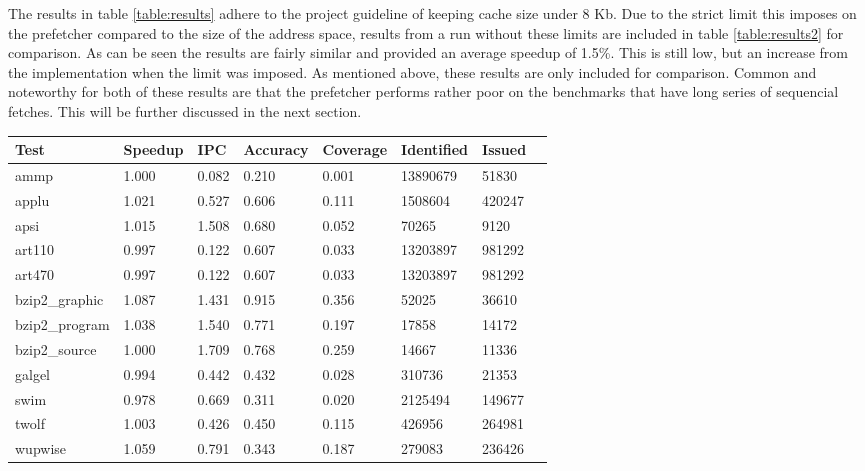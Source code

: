 The results in table \ref{table:results} adhere to the project guideline of keeping cache size under 8 Kb. Due to the strict limit this imposes on the prefetcher compared to the size of the address space, results from a run without these limits are included in table \ref{table:results2} for comparison.
As can be seen the results are fairly similar and provided an average speedup of 1.5\%. This is still low, but an increase from the implementation when the limit was imposed. As mentioned above, these results are only included for comparison.
Common and noteworthy for both of these results are that the prefetcher performs rather poor on the benchmarks that have long series of sequencial fetches. This will be further discussed in the next section.



\begin{table*}[!t]
\renewcommand{\arraystretch}{1.3}
\caption{Prefetcher results without cache size limit}
\label{table:results2}
\centering
\begin{tabular}{|l|l|l|l|l|l|l|l|}
\hline
\bfseries Test & \bfseries Speedup & \bfseries IPC & \bfseries Accuracy & \bfseries Coverage & \bfseries Identified & \bfseries Issued\\
\hline
\hline
ammp 		& 1.000  &	0.082 &	0.210 &	0.001 &	13890679 &	51830\\
applu 		& 1.021 & 	0.527 &	0.606 &	0.111 &	1508604 & 	420247\\
apsi 		& 1.015 & 	1.508 &	0.680 &	0.052 &	70265 &	9120\\	
art110 		& 0.997 & 	0.122 &	0.607 &	0.033 &	13203897 &	981292\\	
art470 		& 0.997 & 	0.122 &	0.607 &	0.033 &	13203897 &	981292\\
bzip2\_graphic 	& 1.087 & 	1.431 &	0.915 &	0.356 &	52025 &	36610\\
bzip2\_program 	& 1.038 & 	1.540 &	0.771 &	0.197 &	17858 &	14172 	\\
bzip2\_source 	& 1.000 & 	1.709 &	0.768 &	0.259 &	14667 &	11336\\
galgel 		& 0.994 & 	0.442 &	0.432 &	0.028 &	310736 & 21353\\
swim 		& 0.978 & 	0.669 &	0.311 &	0.020 &	2125494 & 	149677\\
twolf 		& 1.003 & 	0.426 &	0.450 &	0.115 &	426956 & 	264981	\\
wupwise 	& 1.059 & 	0.791 &	0.343 &	0.187 &	279083 & 	236426\\
\hline
\end{tabular}
\end{table*}



